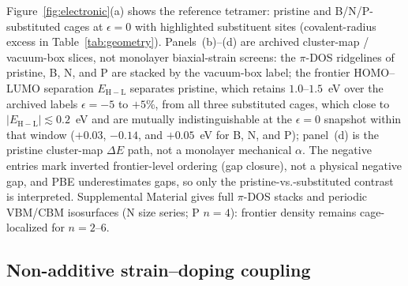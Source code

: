 \documentclass[%
 reprint,
 groupedaddress,
 amsmath,amssymb,
 aps,
 prb,
 floatfix,
]{revtex4-2}
\begin{document}

Figure~\ref{fig:electronic}(a) shows the reference tetramer: pristine and B/N/P-substituted cages at $\epsilon{=}0$ with highlighted substituent sites (covalent-radius excess in Table~\ref{tab:geometry}).
Panels~(b)--(d) are archived cluster-map / vacuum-box slices, not monolayer biaxial-strain screens: the $\pi$-DOS ridgelines of pristine, B, N, and P are stacked by the vacuum-box label; the frontier HOMO--LUMO separation $E_{\mathrm{H-L}}$ separates pristine, which retains $1.0$--$1.5$~eV over the archived labels $\epsilon=-5$ to $+5$\%, from all three substituted cages, which close to $|E_{\mathrm{H-L}}|\lesssim 0.2$~eV and are mutually indistinguishable at the $\epsilon{=}0$ snapshot within that window ($+0.03$, $-0.14$, and $+0.05$~eV for B, N, and P); panel~(d) is the pristine cluster-map $\Delta E$ path, not a monolayer mechanical $\alpha$.
The negative entries mark inverted frontier-level ordering (gap closure), not a physical negative gap, and PBE underestimates gaps, so only the pristine-vs.-substituted contrast is interpreted.
Supplemental Material gives full $\pi$-DOS stacks and periodic VBM/CBM isosurfaces (N size series; P $n{=}4$): frontier density remains cage-localized for $n=2$--$6$.

\subsection{\label{sec:synergy}Non-additive strain--doping coupling}
\end{document}
